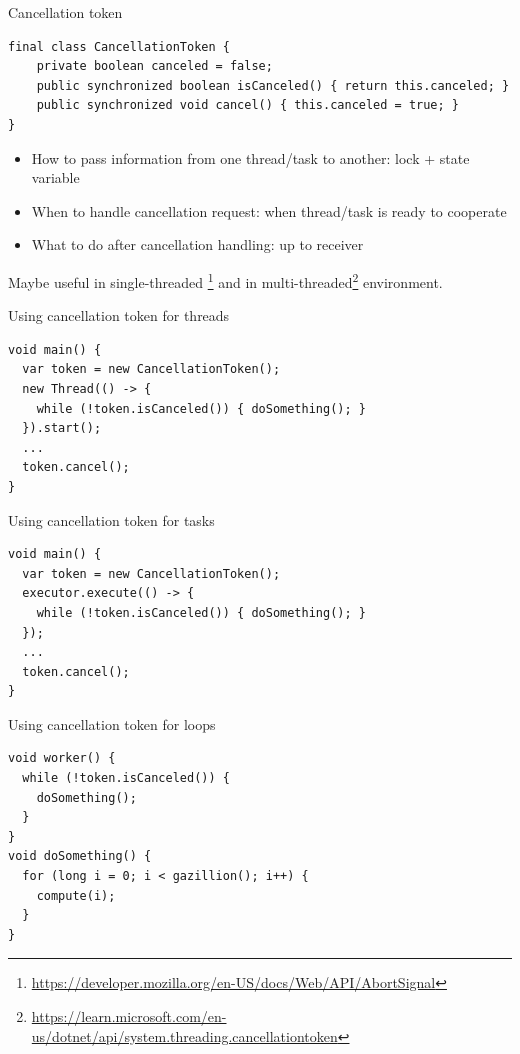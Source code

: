 \begin{frame}[fragile]{Cancellation token}

\begin{verbatim}
final class CancellationToken {
    private boolean canceled = false;
    public synchronized boolean isCanceled() { return this.canceled; }
    public synchronized void cancel() { this.canceled = true; }
}
\end{verbatim}

\pause

\begin{itemize}
    \item How to pass information from one thread/task to another: lock + state variable
    \item When to handle cancellation request: when thread/task is ready to cooperate
    \item What to do after cancellation handling: up to receiver
\end{itemize}

\pause

Maybe useful in single-threaded \footnote<3->{\tiny\url{https://developer.mozilla.org/en-US/docs/Web/API/AbortSignal}} and in multi-threaded\footnote<3->{\tiny\url{https://learn.microsoft.com/en-us/dotnet/api/system.threading.cancellationtoken}} environment.

\end{frame}


\begin{frame}[t,fragile]{Using cancellation token for threads}

\begin{verbatim}
void main() {
  var token = new CancellationToken();
  new Thread(() -> {
    while (!token.isCanceled()) { doSomething(); }
  }).start();  
  ...
  token.cancel();
}
\end{verbatim}
\end{frame}

\begin{frame}[t,fragile]{Using cancellation token for tasks}
\begin{verbatim}
void main() {
  var token = new CancellationToken();
  executor.execute(() -> {
    while (!token.isCanceled()) { doSomething(); }
  });
  ...
  token.cancel();
}
\end{verbatim}
\end{frame}

\begin{frame}[t,fragile]{Using cancellation token for loops}
\begin{verbatim}
void worker() {
  while (!token.isCanceled()) { 
    doSomething(); 
  }
}
void doSomething() {
  for (long i = 0; i < gazillion(); i++) { 
    compute(i); 
  }
}
\end{verbatim}
\end{frame}

